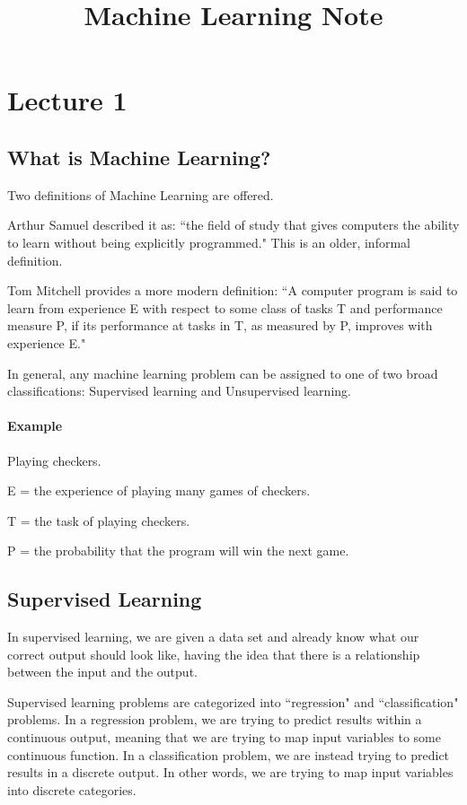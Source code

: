\documentclass[UTF8]{article}
\title{Machine Learning Note}
\date{}
\begin{document}
\maketitle
\tableofcontents

\newpage

\section{Lecture 1}

\subsection{What is Machine Learning?}
Two definitions of Machine Learning are offered. 

Arthur Samuel described it as: ``the field of study that gives computers the ability to learn without being explicitly programmed." This is an older, informal definition.

Tom Mitchell provides a more modern definition: ``A computer program is said to learn from experience E with respect to some class of tasks T and performance measure P, if its performance at tasks in T, as measured by P, improves with experience E."

In general, any machine learning problem can be assigned to one of two broad classifications: Supervised learning and Unsupervised learning.

\paragraph{Example}Playing checkers.

E = the experience of playing many games of checkers.

T = the task of playing checkers.

P = the probability that the program will win the next game.

\subsection{Supervised Learning}

In supervised learning, we are given a data set and already know what our correct output should look like, having the idea that there is a relationship between the input and the output.

Supervised learning problems are categorized into ``regression" and ``classification" problems. In a regression problem, we are trying to predict results within a continuous output, meaning that we are trying to map input variables to some continuous function. In a classification problem, we are instead trying to predict results in a discrete output. In other words, we are trying to map input variables into discrete categories.
\end{document}
